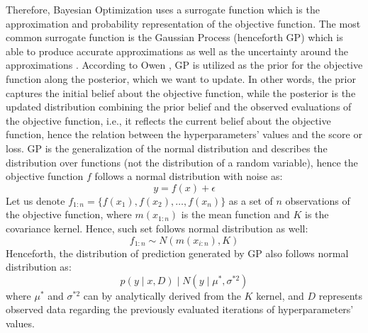 Therefore, Bayesian Optimization uses a surrogate function which is the approximation and probability representation of the objective function. The most common surrogate function is the Gaussian Process (henceforth GP) which is able to produce accurate approximations as well as the uncertainty around the approximations \citep{wang2020bayesian}.
According to Owen \citep{owen2022hyperparameter}, GP is utilized as the prior for the objective function along the posterior, which we want to update.
In other words, the prior captures the initial belief about the objective function, while the posterior is the updated distribution combining the prior belief and the observed evaluations of the objective function, i.e., it reflects the current belief about the objective function, hence the relation between the hyperparameters' values and the score or loss.
GP is the generalization of the normal distribution and describes the distribution over functions (not the distribution of a random variable), hence the objective function $f$ follows a normal distribution with noise as:
\begin{equation}\label{eq}
    y = f\left(x\right) + \epsilon
\end{equation}
Let us denote $f_{1:n} = \{ f\left(x_1\right), f\left(x_2\right), \ldots, f\left(x_n\right)\}$ as a set of $n$ observations of the objective function, where $m\left(x_{1:n}\right)$ is the mean function and $K$ is the covariance kernel. Hence, such set follows normal distribution as well:
\begin{equation}\label{eq}
    f_{1:n} \sim N\left(m\left(x_{i:n}\right), K\right)
\end{equation}
Henceforth, the distribution of prediction generated by GP also follows normal distribution as:
\begin{equation}\label{eq}
    p\left(y \mid x, D\right) \mid N\left(y \mid \mu^{*}, \sigma^{*2}\right)
\end{equation}
where $\mu^{*}$ and $\sigma^{*2}$ can by analytically derived from the $K$ kernel, and $D$ represents observed data regarding the previously evaluated iterations of hyperparameters' values.

